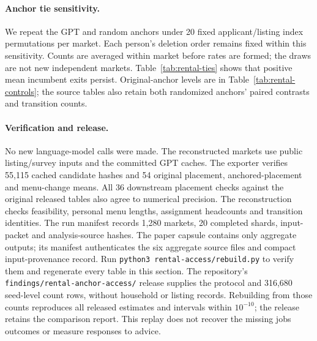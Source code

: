 \paragraph{Anchor tie sensitivity.}
We repeat the GPT and random anchors under 20 fixed applicant/listing index
permutations per market. Each person's deletion order remains fixed within
this sensitivity. Counts are averaged within market before rates are formed;
the draws are not new independent markets. Table~\ref{tab:rental-ties} shows
that positive mean incumbent exits persist. Original-anchor levels are in
Table~\ref{tab:rental-controls}; the source tables also retain both randomized
anchors' paired contrasts and transition counts.

\begin{table}[ht]\centering\small
\caption{GPT anchor averaged over 20 tie draws per market. Expected exits are
relative to the original GPT allocation; fractional counts average those
draws, not people. Coverage uses the same conditional estimand.}\label{tab:rental-ties}

\end{table}

\paragraph{Verification and release.}
No new language-model calls were made. The reconstructed markets use public
listing/survey inputs and the committed GPT caches. The exporter verifies
55,115 cached candidate hashes and 54 original placement, anchored-placement
and menu-change means. All 36 downstream placement checks against the original
released tables also agree to numerical precision. The reconstruction checks
feasibility, personal menu lengths,
assignment headcounts and transition identities. The run manifest records
1,280 markets, 20 completed shards, input-packet and analysis-source hashes.
The paper capsule contains only aggregate outputs; its manifest authenticates
the six aggregate source files and compact input-provenance record. Run
\texttt{python3 rental-access/rebuild.py} to verify
them and regenerate every table in this section. The repository's
\texttt{findings/rental-anchor-access/} release supplies the protocol and
316,680 seed-level count rows, without household or listing records. Rebuilding
from those counts reproduces all released estimates and intervals within
$10^{-10}$; the release retains the comparison report. This replay
does not recover the missing jobs outcomes or measure responses to advice.
